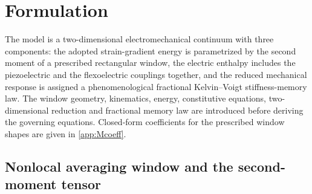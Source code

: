 \FloatBarrier
\section{Formulation}
\label{sec:formulation}

The model is a two-dimensional electromechanical continuum with three
components: the adopted strain-gradient energy is parametrized by the second
moment of a prescribed rectangular window, the electric enthalpy includes the
piezoelectric and the flexoelectric couplings together, and the reduced mechanical response is assigned a phenomenological
fractional Kelvin--Voigt stiffness-memory law. The window geometry, kinematics, energy, constitutive equations,
two-dimensional reduction and fractional memory law are introduced
before deriving the governing equations. Closed-form coefficients for the prescribed window shapes are given in
\ref{app:Mcoeff}.

\FloatBarrier
\subsection{Nonlocal averaging window and the second-moment tensor}
\label{sec:window}

